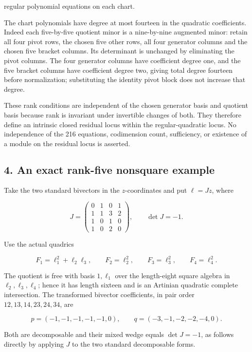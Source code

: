regular polynomial equations on each chart.

The chart polynomials have degree at most fourteen in the quadratic
coefficients. Indeed each five-by-five quotient minor is a nine-by-nine
augmented minor: retain all four pivot rows, the chosen five other rows,
all four generator columns and the chosen five bracket columns. Its
determinant is unchanged by eliminating the pivot columns. The four
generator columns have coefficient degree one, and the five bracket
columns have coefficient degree two, giving total degree fourteen before
normalization; substituting the identity pivot block does not increase
that degree.

These rank conditions are independent of the chosen generator basis and
quotient basis because rank is invariant under invertible changes of
both. They therefore define an intrinsic closed residual locus within
the regular-quadratic locus. No independence of the 216 equations,
codimension count, sufficiency, or existence of a module on the residual
locus is asserted.

\subsection{4. An exact rank-five nonsquare
example}\label{an-exact-rank-five-nonsquare-example}

Take the two standard bivectors in the \(z\)-coordinates and put
\(\ell=Jz\), where

\[
 J=\begin{pmatrix}
 0&1&0&1\\
 1&1&3&2\\
 1&0&1&0\\
 1&0&2&0
 \end{pmatrix},\qquad \det J=-1.
 \tag{E839.10}
\]

Use the actual quadrics

\[
 F_1=\ell_1^2+\ell_2\ell_3,\qquad
 F_2=\ell_2^2,\qquad F_3=\ell_3^2,\qquad F_4=\ell_4^2.
 \tag{E839.11}
\]

The quotient is free with basis \(1,\ell_1\) over the length-eight
square algebra in \(\ell_2,\ell_3,\ell_4\); hence it has length sixteen
and is an Artinian quadratic complete intersection. The transformed
bivector coefficients, in pair order \(12,13,14,23,24,34\), are

\[
 p=(-1,-1,-1,-1,-1,0),\qquad
 q=(-3,-1,-2,-2,-4,0).
 \tag{E839.12}
\]

Both are decomposable and their mixed wedge equals \(\det J=-1\), as
follows directly by applying \(J\) to the two standard decomposable
forms.

